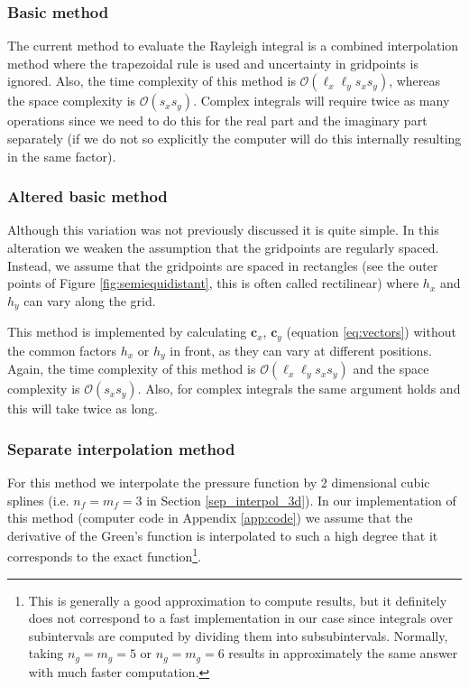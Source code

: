 \subsubsection{Basic method}
The current method to evaluate the Rayleigh integral is a combined interpolation method where the trapezoidal rule is used and uncertainty in gridpoints is ignored.
Also, the time complexity of this method is $\mathcal O(\ell_x\ell_y s_x s_y)$, whereas the space complexity is $\mathcal O(s_x s_y)$.
Complex integrals will require twice as many operations since we need to do this for the real part and the imaginary part separately (if we do not so explicitly the computer will do this internally resulting in the same factor).

\subsubsection{Altered basic method}
Although this variation was not previously discussed it is quite simple.
In this alteration we weaken the assumption that the gridpoints are regularly spaced.
Instead, we assume that the gridpoints are spaced in rectangles (see the outer points of Figure \ref{fig:semiequidistant}, this is often called rectilinear) where $h_x$ and $h_y$ can vary along the grid.

This method is implemented by calculating $\mathbf c_x$, $\mathbf c_y$ (equation \ref{eq:vectors}) without the common factors $h_x$ or $h_y$ in front, as they can vary at different positions.
Again, the time complexity of this method is $\mathcal O(\ell_x\ell_y s_x s_y)$ and the space complexity is $\mathcal O(s_x s_y)$.
Also, for complex integrals the same argument holds and this will take twice as long.

\subsubsection{Separate interpolation method}
For this method we interpolate the pressure function by 2 dimensional cubic splines (i.e. $n_f=m_f=3$ in Section \ref{sep_interpol_3d}).
In our implementation of this method (computer code in Appendix \ref{app:code}) we assume that the derivative of the Green's function is interpolated to such a high degree that it corresponds to the exact function\footnote{This is generally a good approximation to compute results, but it definitely does not correspond to a fast implementation in our case since integrals over subintervals are computed by dividing them into subsubintervals. Normally, taking $n_g=m_g=5$ or $n_g=m_g=6$ results in approximately the same answer with much faster computation.}.

